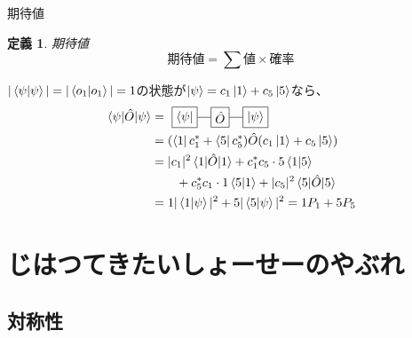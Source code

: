 \documentclass[dvipdfm]{beamer}
\newtheorem*{defn}{定義}
\begin{document}
\begin{frame}{期待値}
    \begin{defn}{期待値}
        \begin{equation*}
            \text{期待値}=\sum\text{値}\times\text{確率}
        \end{equation*}
    \end{defn}
    \begin{example}
        $|\braket{\psi}|=|\braket{o_1}|=1$の状態が$\ket{\psi}=c_1\ket{1}+c_5\ket{5}$なら、
        \begin{equation*}
            \begin{split}
                \ev{\hat{O}}{\psi}
                &=
                \vcenter{\hbox{
                    \begin{tikzpicture}
                        \node at (0,0)[draw,rectangle](O){$\hat{O}$};
                        \node at (-1,0)[draw,rectangle](left){$\bra{\psi}$};
                        \node at (1,0)[draw,rectangle](right){$\ket{\psi}$};
                        \draw(left.east)--(O.west)(O.east)--(right.west);
                    \end{tikzpicture}
                }}
                \\
                &=
                (\bra{1}c_1^\ast+\bra{5}c_5^\ast)\hat{O}(c_1\ket{1}+c_5\ket{5})
                \\
                &=
                |c_1|^2\ev{\hat{O}}{1}
                +
                c_1^\ast c_5\cdot5\bra{1}\ket{5}
                \\
                &\qquad
                +
                c_5^\ast c_1\cdot1\bra{5}\ket{1}
                +
                |c_5|^2\ev{\hat{O}}{5}
                \\
                &=
                1|\braket{1}{\psi}|^2
                +
                5|\braket{5}{\psi}|^2
                =
                1P_1+5P_5
            \end{split}
        \end{equation*}
    \end{example}
\end{frame}


\section{じはつてきたいしょーせーのやぶれ}

\subsection{対称性}
\end{document}
